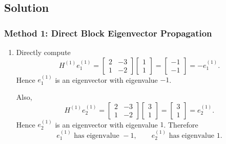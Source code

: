 \documentclass[12pt]{article}
\begin{document}
\newpage
\subsection{Solution}

\subsubsection{Method 1: Direct Block Eigenvector Propagation}
\begin{enumerate}[label=(\alph*)]
  \item Directly compute
  \[
  H^{(1)}e_1^{(1)}=
  \begin{bmatrix}2&-3\\1&-2\end{bmatrix}
  \begin{bmatrix}1\\1\end{bmatrix}
  =\begin{bmatrix}-1\\-1\end{bmatrix}
  =-e_1^{(1)}.
  \]
  Hence $e_1^{(1)}$ is an eigenvector with eigenvalue $-1$.

  Also,
  \[
  H^{(1)}e_2^{(1)}=
  \begin{bmatrix}2&-3\\1&-2\end{bmatrix}
  \begin{bmatrix}3\\1\end{bmatrix}
  =\begin{bmatrix}3\\1\end{bmatrix}
  =e_2^{(1)}.
  \]
  Hence $e_2^{(1)}$ is an eigenvector with eigenvalue $1$.
  Therefore
  \[
  \boxed{e_1^{(1)}\text{ has eigenvalue }-1,
  \qquad
  e_2^{(1)}\text{ has eigenvalue }1.}
  \]


\end{enumerate}
\end{document}
